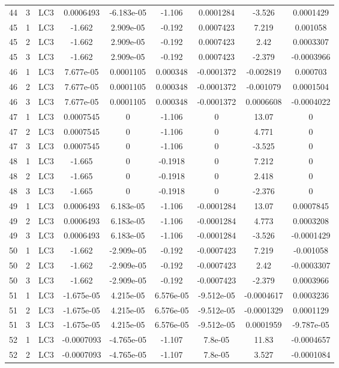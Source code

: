 \documentclass{article}%
\begin{document}
\begin{longtable}{| c c c | c c c c c c |}
44&3&LC3&0.0006493&{-}6.183e{-}05&{-}1.106&0.0001284&{-}3.526&0.0001429\\%
45&1&LC3&{-}1.662&2.909e{-}05&{-}0.192&0.0007423&7.219&0.001058\\%
45&2&LC3&{-}1.662&2.909e{-}05&{-}0.192&0.0007423&2.42&0.0003307\\%
45&3&LC3&{-}1.662&2.909e{-}05&{-}0.192&0.0007423&{-}2.379&{-}0.0003966\\%
46&1&LC3&7.677e{-}05&0.0001105&0.000348&{-}0.0001372&{-}0.002819&0.000703\\%
46&2&LC3&7.677e{-}05&0.0001105&0.000348&{-}0.0001372&{-}0.001079&0.0001504\\%
46&3&LC3&7.677e{-}05&0.0001105&0.000348&{-}0.0001372&0.0006608&{-}0.0004022\\%
47&1&LC3&0.0007545&0&{-}1.106&0&13.07&0\\%
47&2&LC3&0.0007545&0&{-}1.106&0&4.771&0\\%
47&3&LC3&0.0007545&0&{-}1.106&0&{-}3.525&0\\%
48&1&LC3&{-}1.665&0&{-}0.1918&0&7.212&0\\%
48&2&LC3&{-}1.665&0&{-}0.1918&0&2.418&0\\%
48&3&LC3&{-}1.665&0&{-}0.1918&0&{-}2.376&0\\%
49&1&LC3&0.0006493&6.183e{-}05&{-}1.106&{-}0.0001284&13.07&0.0007845\\%
49&2&LC3&0.0006493&6.183e{-}05&{-}1.106&{-}0.0001284&4.773&0.0003208\\%
49&3&LC3&0.0006493&6.183e{-}05&{-}1.106&{-}0.0001284&{-}3.526&{-}0.0001429\\%
50&1&LC3&{-}1.662&{-}2.909e{-}05&{-}0.192&{-}0.0007423&7.219&{-}0.001058\\%
50&2&LC3&{-}1.662&{-}2.909e{-}05&{-}0.192&{-}0.0007423&2.42&{-}0.0003307\\%
50&3&LC3&{-}1.662&{-}2.909e{-}05&{-}0.192&{-}0.0007423&{-}2.379&0.0003966\\%
51&1&LC3&{-}1.675e{-}05&4.215e{-}05&6.576e{-}05&{-}9.512e{-}05&{-}0.0004617&0.0003236\\%
51&2&LC3&{-}1.675e{-}05&4.215e{-}05&6.576e{-}05&{-}9.512e{-}05&{-}0.0001329&0.0001129\\%
51&3&LC3&{-}1.675e{-}05&4.215e{-}05&6.576e{-}05&{-}9.512e{-}05&0.0001959&{-}9.787e{-}05\\%
52&1&LC3&{-}0.0007093&{-}4.765e{-}05&{-}1.107&7.8e{-}05&11.83&{-}0.0004657\\%
52&2&LC3&{-}0.0007093&{-}4.765e{-}05&{-}1.107&7.8e{-}05&3.527&{-}0.0001084\\%

\end{longtable}
\end{document}
